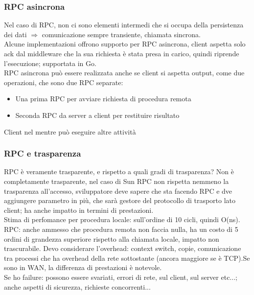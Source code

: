 \documentclass{article}
\begin{document}
\subsubsection{RPC asincrona}
Nel caso di RPC, non ci sono elementi intermedi che si occupa della persistenza dei dati $\Rightarrow$ comunicazione sempre transiente, chiamata sincrona.\\ Alcune implementazioni offrono supporto per RPC asincrona, client aspetta solo ack dal middleware che la sua richiesta è stata presa in carico, quindi riprende l'esecuzione; supportata in Go.\\ RPC asincrona può essere realizzata anche se client si aspetta output, come due operazioni, che sono due RPC separate:
\begin{itemize}
\item Una prima RPC per avviare richiesta di procedura remota
\item Seconda RPC da server a client per restituire risultato
\end{itemize}
Client nel mentre può eseguire altre attività
\subsubsection{RPC e trasparenza}
RPC è veramente trasparente, e rispetto a quali gradi di trasparenza? Non è completamente trasparente, nel caso di Sun RPC non rispetta nemmeno la trasparenza all'accesso, sviluppatore deve sapere che sta facendo RPC e dve aggiungere parametro in più, che sarà gestore del protocollo di trasporto lato client; ha anche impatto in termini di prestazioni.\\ Stima di perfomance per procedura locale: sull'ordine di 10 cicli, quindi O(ns).\\ RPC:
anche ammesso che procedura remota non faccia nulla, ha un costo di 5 ordini di grandezza superiore rispetto alla chiamata locale, impatto non trascurabile. Devo considerare l'overhead: context switch, copie, comunicazione tra processi che ha overhead della rete sottostante (ancora maggiore se è TCP).Se sono in WAN, la differenza di prestazioni è notevole.\\ Se ho failure: possono essere svariati, errori di rete, sul client, sul server etc...; anche aspetti di sicurezza, richieste concorrenti...
\end{document}
